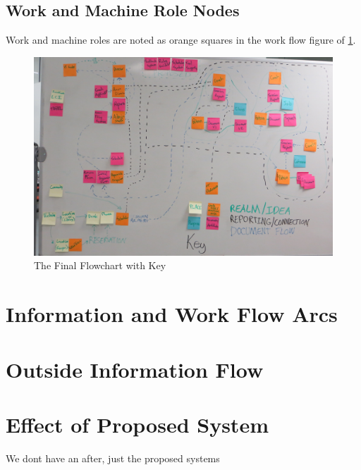 \documentclass[12pt]{article} %
\begin{document}
\begin{samepage}
\section{Work and Machine Role Nodes} %
\nopagebreak
Work and machine roles are noted as orange squares in the work flow figure of \ref{fig:Workflow_final}.

  \begin{figure}[H]
    \centering
    \includegraphics[width=0.5\linewidth]{flow/flowchart_final}
    \caption{The Final Flowchart with Key}
    \label{fig:Workflow_final}
  \end{figure}

\end{samepage}

\section{Information and Work Flow Arcs} %

\section{Outside Information Flow} %


\section{Effect of Proposed System} %
We dont have an after, just the proposed systems
\end{document}
